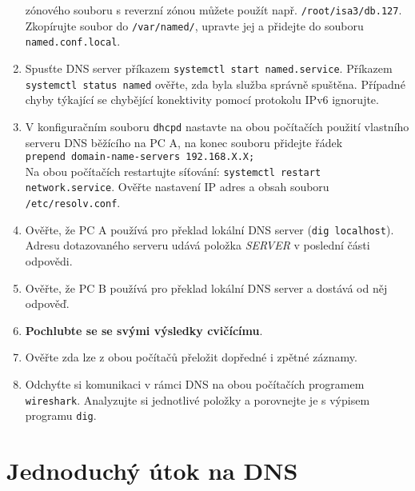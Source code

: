 \begin{enumerate}
    zónového souboru s reverzní zónou můžete použít např. {\tt /root/isa3/db.127}.
    Zkopírujte soubor do {\tt /var/named/}, upravte jej a přidejte do
    souboru {\tt named.conf.local}.
  \item Spusťte DNS server příkazem {\tt systemctl start named.service}.
    Příkazem {\tt systemctl status named} ověřte, zda byla služba správně spuštěna.
    Případné chyby týkající se chybějící konektivity pomocí protokolu IPv6 ignorujte.
  \item V konfiguračním souboru {\tt dhcpd} nastavte na obou počítačích použití vlastního
    serveru DNS běžícího na PC A, na konec souboru přidejte řádek \\
    {\tt prepend domain-name-servers
    192.168.X.X;} \\ Na obou počítačích restartujte síťování: {\tt systemctl restart network.service}.
    Ověřte nastavení IP adres a obsah souboru {\tt /etc/resolv.conf}.
  \item Ověřte, že PC A používá pro překlad lokální DNS server ({\tt dig
    localhost}). Adresu dotazovaného serveru udává položka {\em SERVER} v
    poslední části odpovědi.
  \item Ověřte, že PC B používá pro překlad lokální DNS server a dostává od něj odpověď.
  \item {\bf Pochlubte se se svými výsledky cvičícímu}.
  \item Ověřte zda lze z obou počítačů přeložit dopředné i zpětné záznamy.
  \item Odchyťte si komunikaci v rámci DNS na obou počítačích programem
    {\tt wireshark}. Analyzujte si jednotlivé položky a porovnejte je s výpisem
    programu {\tt dig}.

\end{enumerate}

\section{Jednoduchý útok na DNS}

